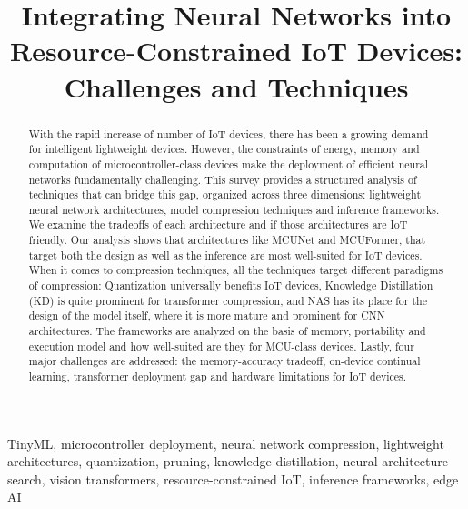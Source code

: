 \documentclass[conference]{IEEEtran}
\begin{document}
	
	\title{Integrating Neural Networks into Resource-Constrained IoT Devices: Challenges and Techniques}
	
	\author{
		}
	
	\maketitle
	
	\begin{abstract}
		With the rapid increase of number of IoT devices, there has been a growing demand for intelligent lightweight devices. However, the constraints of energy, memory and computation of microcontroller-class devices make the deployment of efficient neural networks fundamentally challenging. This survey provides a structured analysis of techniques that can bridge this gap, organized across three dimensions: lightweight neural network architectures, model compression techniques and inference frameworks. We examine the tradeoffs of each architecture and if those architectures are IoT friendly. Our analysis shows that architectures like MCUNet and MCUFormer, that target both the design as well as the inference are most well-suited for IoT devices. When it comes to compression techniques, all the techniques target different paradigms of compression: Quantization universally benefits IoT devices, Knowledge Distillation (KD) is quite prominent for transformer compression, and NAS has its place for the design of the model itself, where it is more mature and prominent for CNN architectures. The frameworks are analyzed on the basis of memory, portability and execution model and how well-suited are they for MCU-class devices. Lastly, four major challenges are addressed: the memory-accuracy tradeoff, on-device continual learning, transformer deployment gap and hardware limitations for IoT devices.
	\end{abstract}
	
	\begin{IEEEkeywords}
		TinyML, microcontroller deployment, neural network compression, 
		lightweight architectures, quantization, pruning, knowledge 
		distillation, neural architecture search, vision transformers, 
		resource-constrained IoT, inference frameworks, edge AI
	\end{IEEEkeywords}
	
\end{document}
